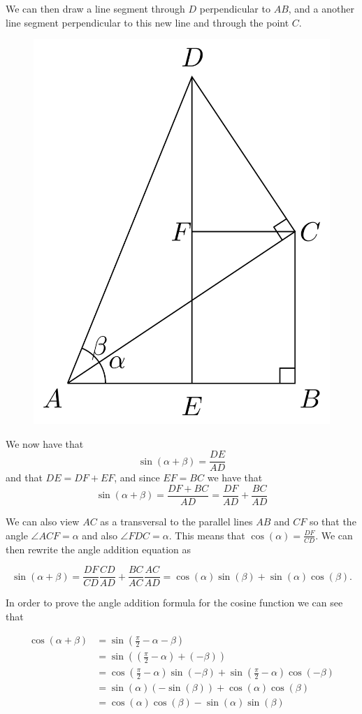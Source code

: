 \documentclass[
]{book}
\theoremstyle{definition}
\theoremstyle{definition}
\theoremstyle{definition}
\theoremstyle{remark}
\begin{document}
We can then draw a line segment through \(D\) perpendicular to \(AB\), and a another line segment perpendicular to this new line and through the point \(C\).

\begin{figure}

{\centering \includegraphics[width=0.3\linewidth]{tikz/angle-addition-sine2} 

}

\end{figure}

We now have that \[\sin\left(\alpha+\beta\right) = \frac{DE}{AD}\] and that \(DE=DF+EF\), and since \(EF=BC\) we have that \[\sin\left(\alpha+\beta\right) = \frac{DF+BC}{AD}= \frac{DF}{AD} + \frac{BC}{AD}\]

We can also view \(AC\) as a transversal to the parallel lines \(AB\) and \(CF\) so that the angle \(\angle ACF=\alpha\) and also \(\angle FDC = \alpha\). This means that \(\cos(\alpha) = \frac{DF}{CD}\). We can then rewrite the angle addition equation as

\[\sin\left(\alpha+\beta\right)  = \frac{DF}{CD}\frac{CD}{AD} + \frac{BC}{AC}\frac{AC}{AD} =\cos(\alpha) \sin(\beta) + \sin(\alpha) \cos(\beta).\]

In order to prove the angle addition formula for the cosine function we can see that

\begin{align*}
\cos(\alpha+\beta) &= \sin\left(\frac{\pi}{2} - \alpha - \beta\right) \\
&= \sin \left( \left(\frac{\pi}{2}-\alpha\right) + (-\beta) \right) \\
&= \cos\left(\frac{\pi}{2}-\alpha\right) \sin(-\beta)+\sin\left(\frac{\pi}{2}-\alpha\right)\cos(-\beta) \\
&= \sin(\alpha)\left(-\sin(\beta)\right) +\cos(\alpha)\cos(\beta) \\
&= \cos(\alpha) \cos(\beta) - \sin(\alpha) \sin(\beta)
\end{align*}
\end{document}
